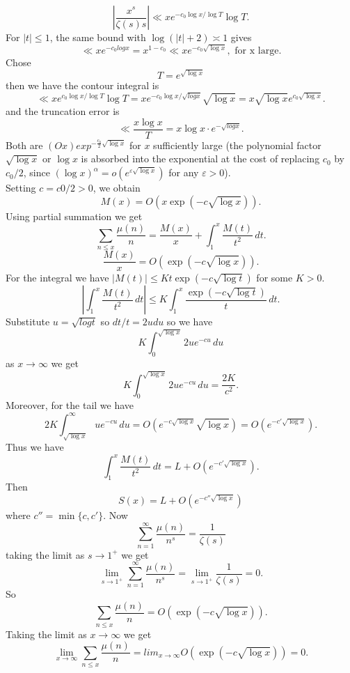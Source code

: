 \documentclass[12pt]{article}
\begin{document}
\[
    \left|\frac{x^s}{\zeta(s)s}\right|\ll xe^{-c_0\log x/\log T}\log T.
\]
For $|t| \leq 1$, the same bound with $\log(|t| + 2) \asymp 1$ gives
\[
    \ll x e^{-c_0 log x} = x^{1-c_0} \ll x e^{-c_0 \sqrt{\log x}}, \text{ for x large}.
\]
Chose
\[
    T=e^{\sqrt{\log x}}
\]
then we have the contour integral is  
\[
    \ll xe^{c_0 \log x/ \log T}\log T = xe^{-c_0 \log x/\sqrt{log x}}\sqrt{\log x} = x\sqrt{\log x}e^{c_0 \sqrt{\log x}}.
\]
and the truncation error is
\[
    \ll \frac{x \log x}{T} = x \log x · e^{-\sqrt{log x}}.
\]
Both are $(Ox) exp^{-\frac{c_0}{2}  \sqrt{\log x}}$ for $x$ sufficiently large (the polynomial factor $\sqrt{\log x}$ or $\log x$ is absorbed into the exponential at the cost of replacing $c_0$ by $c_0/2$, since $(\log x)^\alpha = o(e^{\varepsilon\sqrt{\log x}})$ for any $\varepsilon > 0$).\\
Setting $c = c0/2 > 0$, we obtain
\[
    M(x)=O(x\exp(-c\sqrt{\log x})).
\]
Using partial summation we get
\[
    \sum_{n\leq x}\frac{\mu(n)}{n}=\frac{M(x)}{x}+\int_{1}^{x}\frac{M(t)}{t^2}\,dt.
\]
\[
    \frac{M(x)}{x}=O(\exp(-c\sqrt{\log x})).
\]
For the integral we have $|M(t)|\leq Kt\exp(-c\sqrt{\log t})$ for some $K>0$.
\[
    \left|\int_{1}^{x}\frac{M(t)}{t^2}\,dt\right|\leq K\int_{1}^{x}\frac{\exp(-c\sqrt{\log t})}{t}\,dt.
\]
Substitute $u=\sqrt{logt}$ so $dt/t=2udu$ so we have
\[
    K\int_{0}^{\sqrt{\log x}}2ue^{-cu}\,du
\]
as $x\to\infty$ we get
\[
    K\int_{0}^{\sqrt{\log x}}2ue^{-cu}\,du=\frac{2K}{c^2}.
\]
Moreover, for the tail we have
\[
    2K\int_{\sqrt{\log x}}^{\infty}ue^{-cu}\,du=O(e^{-c\sqrt{\log x}}\sqrt{\log x})=O(e^{-c'\sqrt{\log x}}).
\]
Thus we have
\[
    \int_{1}^{x}\frac{M(t)}{t^2}\,dt=L+O(e^{-c'\sqrt{\log x}}).
\]
Then
\[
    S(x)=L+O(e^{-c''\sqrt{\log x}})
\]
where $c''=\min\{c,c'\}$. Now 
\[
    \sum_{n=1}^{\infty}\frac{\mu(n)}{n^s}=\frac{1}{\zeta(s)}
\]
taking the limit as $s\to1^+$ we get
\[
    \lim_{s\to1^+}\sum_{n=1}^{\infty}\frac{\mu(n)}{n^s}=\lim_{s\to1^+}\frac{1}{\zeta(s)}=0.
\]
So 
\[
    \sum_{n\leq x}\frac{\mu(n)}{n}= O\left(\exp\left(-c\sqrt{\log x}\right)\right).
\]
Taking the limit as $x\to\infty$ we get
\[
    \lim_{x\to\infty}\sum_{n\leq x}\frac{\mu(n)}{n}= lim_{x\to\infty}O\left(\exp\left(-c\sqrt{\log x}\right)\right)=0.
\]
\end{document}
